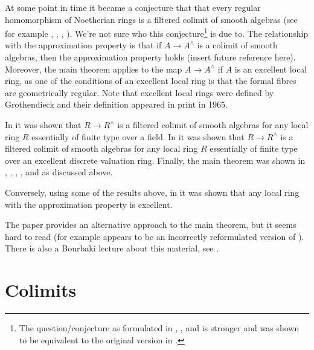\medskip\noindent
At some point in time it became a conjecture that
that every regular homomorphism of Noetherian rings is a
filtered colimit of smooth algebras (see for example
\cite{Raynaud-Rennes}, \cite{popescu-global}, \cite{Artin-power-series},
\cite{Artin-Denef}). We're not sure who this conjecture\footnote{The
question/conjecture as formulated in \cite{Artin-power-series},
\cite{Artin-Denef}, and \cite{popescu-global} is stronger and was shown
to be equivalent to the original version in \cite{Cipu}.}
is due to. The relationship with the approximation property is that if
$A \to A^\wedge$ is a colimit of smooth algebras, then the approximation
property holds (insert future reference here). Moreover, the main theorem
applies to the map $A \to A^\wedge$ if $A$ is an excellent local ring, as one
of the conditions of an excellent local ring is that the formal
fibres are geometrically regular. Note that excellent local rings
were defined by Grothendieck and their definition appeared in
print in 1965.

\medskip\noindent
In \cite{Artin-power-series} it was shown that
$R \to R^\wedge$ is a filtered colimit of smooth algebras for any
local ring $R$ essentially of finite type over a field.
In \cite{Rotthaus-Artin} it was shown that $R \to R^\wedge$
is a filtered colimit of smooth algebras for any local ring $R$
essentially of finite type over an excellent discrete valuation ring.
Finally, the main theorem was shown in
\cite{popescu-GND}, \cite{popescu-GNDA}, \cite{popescu-letter}, 
\cite{Ogoma}, and \cite{swan} as discussed above.

\medskip\noindent
Conversely, using some of the results above, in \cite{Rotthaus-excellent}
it was shown that any local ring with the approximation property is excellent.

\medskip\noindent
The paper \cite{Spivakovsky} provides an alternative approach to the
main theorem, but it seems hard to read (for example
\cite[Lemma 5.2]{Spivakovsky} appears to be an incorrectly reformulated
version of \cite[Lemma 3]{Elkik}). There is also a Bourbaki
lecture about this material, see \cite{Teissier}.












\section{Colimits}
\label{section-colimits}

